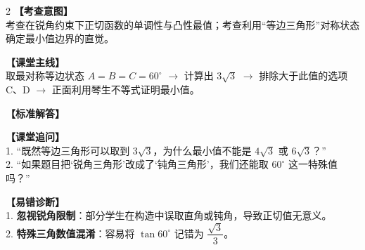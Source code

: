 \documentclass[11pt,a4paper]{ctexart}
\begin{document}
\vspace{0.8em}
\par{}
\vspace{0.8em}

\qTwoStem
\qTwoOptions

\begin{paracol}{2}
  \textbf{【考查意图】}\\
  考查在锐角约束下正切函数的单调性与凸性最值；考查利用“等边三角形”对称状态确定最小值边界的直觉。
  
  \textbf{【课堂主线】}\\
  取最对称等边状态 \(A=B=C=60^\circ\) \(\to\) 计算出 \(3\sqrt{3}\) \(\to\) 排除大于此值的选项 C、D \(\to\) 正面利用琴生不等式证明最小值。
  
  \textbf{【标准解答】}\\
  \qTwoSolution
  
  \textbf{【课堂追问】}\\
  1. “既然等边三角形可以取到 \(3\sqrt{3}\)，为什么最小值不能是 \(4\sqrt{3}\) 或 \(6\sqrt{3}\)？”\\
  2. “如果题目把‘锐角三角形’改成了‘钝角三角形’，我们还能取 \(60^\circ\) 这一特殊值吗？”
  
  \switchcolumn
  \textbf{【易错诊断】}\\
  1. \textbf{忽视锐角限制}：部分学生在构造中误取直角或钝角，导致正切值无意义。\\
  2. \textbf{特殊三角数值混淆}：容易将 \(\tan 60^\circ\) 记错为 \(\dfrac{\sqrt{3}}{3}\)。
\end{paracol}

\vspace{0.8em}
\par{}
\vspace{0.8em}

\newpage

\qThreeStem
\qThreeOptions
\end{document}
